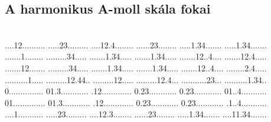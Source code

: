  
 
\pagestyle{empty}

\vspace*{\fill}
\subsection*{A harmonikus A-moll skála fokai}~\\
          {....12..........%
           .....23.........%
           ....12.4........%
           ......23........%
           .....1.34.......%
           .....1.34.......} 
          {.......1........%
           .........34.....%
           .......1.34.....%
           .......1.34.....%
           .......12..4....%
           .......12.4.....}
          {.......12.......%
           .........34.....%
           .......1.34.....%
           .......1.34.....%
           .......12..4....%
           ........2.4.....}
          {..........1.....%
           .........12.44..%
           .........12.....%
           .........12.4...%
           ...........23...%
           ..........1.34..}
          {0...............%
           01.3............%
           .12.............%
           0.23............%
           0.23............%
           01..4...........}
          {01..............%
           01.3............%
           .12.............%
           0.23............%
           0.23............%
           .1..4...........}
          {....1...........%
           .....23.........%
           ....12.3........%
           ......23........%
           .....1.34.......%
           ....11.34.......}
\vspace*{\fill}

